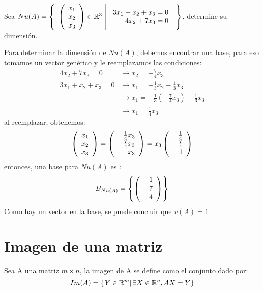 \begin{ejemplo}
Sea $Nu(A)= \left\{\begin{array}{c|c} {\left( \begin{array}{c} x_1\\ x_2\\ x_3 \end{array}\right) \in \mathbb{R}^3 }&{\begin{array}{r}
    3x_1 + x_2 + x_3 = 0  \\
    4x_2 + 7x_3 = 0 
\end{array}} \end{array} \right\}$, determine su dimensión.
\end{ejemplo}
\sol 
Para determinar la dimensión de $Nu(A)$, debemos encontrar una base, para eso tomamos un vector genérico y le reemplazamos las condiciones:
\begin{align*}
    4x_2 + 7x_3 = 0 &\rightarrow x_2 = -\frac{7}{4}x_3\\
    3x_1 + x_2 + x_3 = 0 &\rightarrow x_1 = -\frac{1}{3} x_2 - \frac{1}{3}x_3\\ &\rightarrow x_1 = -\frac{1}{3}\left(-\frac{7}{4}x_3 \right) - \frac{1}{3}x_3\\
    &\rightarrow x_1 = \frac{1}{4}x_3
\end{align*}
al reemplazar, obtenemos:
\[ \left( \begin{array}{r} x_1\\ x_2\\ x_3 \end{array} \right)  = \left( \begin{array}{r} \frac{1}{4}x_3\\ -\frac{7}{4}x_3\\ x_3 \end{array} \right)   = x_3\left( \begin{array}{r} \frac{1}{4}\\ -\frac{7}{4}\\ 1 \end{array} \right) \]
entonces, una base para $Nu(A)$ es :
$$B_{Nu(A)} =  \left\{\left( \begin{array}{r} 1\\ -7\\ 4 \end{array} \right)  \right\} $$
Como hay un vector en la base, se puede concluir que $v(A) = 1$



\newpage
\section{Imagen de una matriz}
\begin{dfn}
Sea A una matriz $m\times n$, la imagen de A se define como el conjunto dado por:
~\\
\[Im(A)=\left\{ \left. Y \in \mathbb{R}^m \right| \exists X \in \mathbb{R}^n,   AX=Y \right\}\]
\end{dfn}



